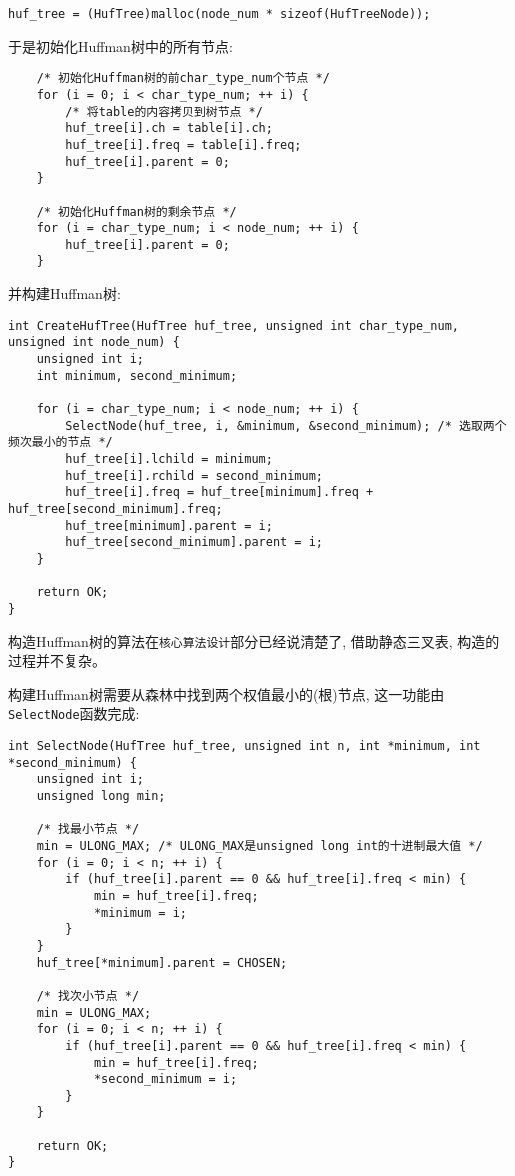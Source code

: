 \documentclass[a4paper]{ctexart}
\begin{document}
{\setmainfont{Courier New Bold}              
\begin{lstlisting}
huf_tree = (HufTree)malloc(node_num * sizeof(HufTreeNode));
\end{lstlisting}}

于是初始化Huffman树中的所有节点:

{\setmainfont{Courier New Bold}              
\begin{lstlisting}
    /* 初始化Huffman树的前char_type_num个节点 */
    for (i = 0; i < char_type_num; ++ i) {
        /* 将table的内容拷贝到树节点 */
        huf_tree[i].ch = table[i].ch;
        huf_tree[i].freq = table[i].freq;
        huf_tree[i].parent = 0;
    }

    /* 初始化Huffman树的剩余节点 */
    for (i = char_type_num; i < node_num; ++ i) {
        huf_tree[i].parent = 0;
    }
\end{lstlisting}}

并构建Huffman树:

{\setmainfont{Courier New Bold}              
\begin{lstlisting}
int CreateHufTree(HufTree huf_tree, unsigned int char_type_num, unsigned int node_num) {
    unsigned int i;
    int minimum, second_minimum;

    for (i = char_type_num; i < node_num; ++ i) {
        SelectNode(huf_tree, i, &minimum, &second_minimum); /* 选取两个频次最小的节点 */
        huf_tree[i].lchild = minimum;
        huf_tree[i].rchild = second_minimum;
        huf_tree[i].freq = huf_tree[minimum].freq + huf_tree[second_minimum].freq;
        huf_tree[minimum].parent = i;
        huf_tree[second_minimum].parent = i;
    }

    return OK;
}
\end{lstlisting}}

构造Huffman树的算法在\texttt{核心算法设计}部分已经说清楚了, 借助静态三叉表, 构造的过程并不复杂。

构建Huffman树需要从森林中找到两个权值最小的(根)节点, 这一功能由\texttt{SelectNode}函数完成:

{\setmainfont{Courier New Bold}              
\begin{lstlisting}
int SelectNode(HufTree huf_tree, unsigned int n, int *minimum, int *second_minimum) {
    unsigned int i;
    unsigned long min;

    /* 找最小节点 */
    min = ULONG_MAX; /* ULONG_MAX是unsigned long int的十进制最大值 */
    for (i = 0; i < n; ++ i) {
        if (huf_tree[i].parent == 0 && huf_tree[i].freq < min) {
            min = huf_tree[i].freq;
            *minimum = i;
        }
    }
    huf_tree[*minimum].parent = CHOSEN;

    /* 找次小节点 */
    min = ULONG_MAX;
    for (i = 0; i < n; ++ i) {
        if (huf_tree[i].parent == 0 && huf_tree[i].freq < min) {
            min = huf_tree[i].freq;
            *second_minimum = i;
        }
    }

    return OK;
}
\end{lstlisting}}
\end{document}

